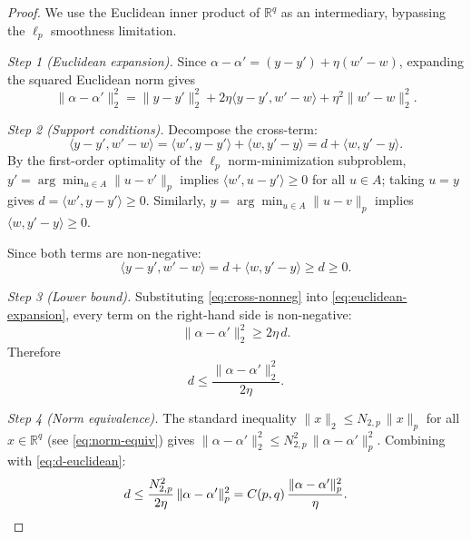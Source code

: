\documentclass[10pt,a4paper]{amsart}
\newcommand{\R}{\mathbb{R}}
\begin{document}
\begin{proof}
We use the Euclidean inner product of $\R^q$ as an intermediary, bypassing the $\ell_p$ smoothness limitation.

\medskip
\noindent\emph{Step 1 (Euclidean expansion).}
Since $\alpha - \alpha' = (y - y') + \eta(w' - w)$, expanding the squared Euclidean norm gives
\begin{equation}\label{eq:euclidean-expansion}
\|\alpha - \alpha'\|_2^2
= \|y - y'\|_2^2 + 2\eta \langle y - y', w' - w \rangle + \eta^2 \|w' - w\|_2^2.
\end{equation}

\medskip
\noindent\emph{Step 2 (Support conditions).}
Decompose the cross-term:
\[
\langle y - y', w' - w \rangle = \langle w', y - y' \rangle + \langle w, y' - y \rangle = d + \langle w, y' - y \rangle.
\]
By the first-order optimality of the $\ell_p$ norm-minimization subproblem, $y' = \arg\min_{u \in A} \|u - v'\|_p$ implies $\langle w', u - y' \rangle \ge 0$ for all $u \in A$; taking $u = y$ gives $d = \langle w', y - y' \rangle \ge 0$. Similarly, $y = \arg\min_{u \in A} \|u - v\|_p$ implies $\langle w, y' - y \rangle \ge 0$.

Since both terms are non-negative:
\begin{equation}\label{eq:cross-nonneg}
\langle y - y', w' - w \rangle = d + \langle w, y' - y \rangle \ge d \ge 0.
\end{equation}

\medskip
\noindent\emph{Step 3 (Lower bound).}
Substituting \eqref{eq:cross-nonneg} into \eqref{eq:euclidean-expansion}, every term on the right-hand side is non-negative:
\[
\|\alpha - \alpha'\|_2^2 \ge 2\eta \, d.
\]
Therefore
\begin{equation}\label{eq:d-euclidean}
d \le \frac{\|\alpha - \alpha'\|_2^2}{2\eta}.
\end{equation}

\medskip
\noindent\emph{Step 4 (Norm equivalence).}
The standard inequality $\|x\|_2 \le N_{2,p}\,\|x\|_p$ for all $x \in \R^q$ (see \eqref{eq:norm-equiv}) gives $\|\alpha - \alpha'\|_2^2 \le N_{2,p}^2\,\|\alpha - \alpha'\|_p^2$. Combining with \eqref{eq:d-euclidean}:
\[
d \le \frac{N_{2,p}^2}{2\eta}\,\|\alpha - \alpha'\|_p^2 = C(p,q)\,\frac{\|\alpha - \alpha'\|_p^2}{\eta}. \qedhere
\]
\end{proof}
\end{document}
